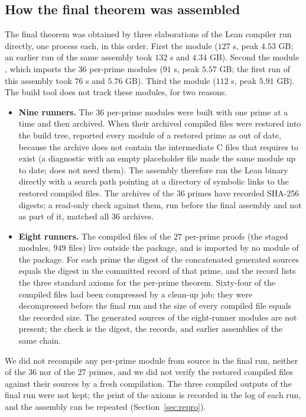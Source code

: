 \documentclass[11pt]{article}
\theoremstyle{remark}
\begin{document}
\subsection{How the final theorem was assembled}\label{sec:assembly}
The final theorem was obtained by three elaborations of the Lean compiler run directly, one process each, in this order. First the module  ($127$ s, peak $4.53$ GB; an earlier run of the same assembly took $132$ s and $4.34$ GB). Second the module , which imports the $36$ per-prime modules ($91$ s, peak $5.57$ GB; the first run of this assembly took $76$ s and $5.76$ GB). Third the module  ($112$ s, peak $5.91$ GB). The build tool  does not track these modules, for two reasons.
\begin{itemize}
\item \textbf{Nine runners.} The $36$ per-prime modules were built with  one prime at a time and then archived. When their archived compiled files were restored into the build tree,  reported every module of a restored prime as out of date, because the archive does not contain the intermediate C files that  requires to exist (a diagnostic with an empty placeholder file made the same module up to date;  does not need them). The assembly therefore ran the Lean binary directly with a search path pointing at a directory of symbolic links to the restored compiled files. The archives of the $36$ primes have recorded SHA-256 digests; a read-only check against them, run before the final assembly and not as part of it, matched all $36$ archives.
\item \textbf{Eight runners.} The compiled files of the $27$ per-prime proofs (the staged modules, $949$ files) live outside the  package, and  is imported by no module of the package. For each prime the digest of the concatenated generated sources equals the digest in the committed record of that prime, and the record lists the three standard axioms for the per-prime theorem. Sixty-four of the compiled files had been compressed by a clean-up job; they were decompressed before the final run and the size of every compiled file equals the recorded size. The generated sources of the eight-runner modules are not present; the check is the digest, the records, and earlier assemblies of the same chain.
\end{itemize}
We did not recompile any per-prime module from source in the final run, neither of the $36$ nor of the $27$ primes, and we did not verify the restored compiled files against their sources by a fresh compilation. The three compiled outputs of the final run were not kept; the print of the axioms is recorded in the log of each run, and the assembly can be repeated (Section~\ref{sec:repro}).
\end{document}
